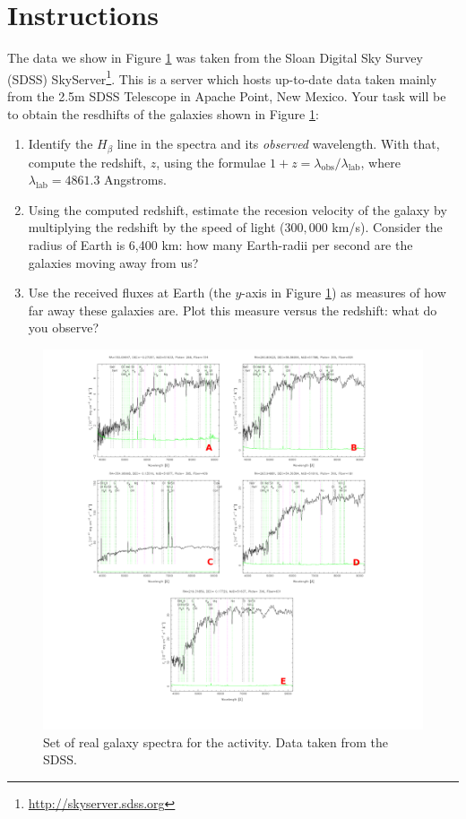 \documentclass{tufte-handout}
\begin{document}
\section{Instructions}\label{sec:intro}
\begin{fullwidth}
The data we show in Figure \ref{fig:spectra} was taken from the Sloan Digital Sky Survey (SDSS) 
SkyServer\footnote{\url{http://skyserver.sdss.org}}. This is a server which hosts up-to-date data taken mainly from the 
2.5m SDSS Telescope in Apache Point, New Mexico. Your task will be to obtain the resdhifts of the galaxies shown in 
Figure \ref{fig:spectra}:

\begin{enumerate}
\item Identify the $H_\beta$ line in the spectra and its \textit{observed} wavelength. With that, compute the redshift, $z$, using the formulae $1 + z = \lambda_{\textrm{obs}}/\lambda_{\textrm{lab}}$, where $\lambda_{\textrm{lab}}=4861.3$ Angstroms.
\item Using the computed redshift, estimate the recesion velocity of the galaxy by multiplying the redshift by the speed of light ($300,000$ km/s). Consider the radius of Earth is 6,400 km: how many Earth-radii per second are the galaxies moving away from us?
\item Use the received fluxes at Earth (the $y$-axis in Figure \ref{fig:spectra}) as measures of how far away these galaxies are. Plot this measure versus the redshift: what do you observe?
\end{enumerate}

\begin{figure}
  \includegraphics[width=2.0\columnwidth]{figures_activity3/spectra1.pdf}
  \caption{Set of real galaxy spectra for the activity. Data taken from the SDSS.}
  \label{fig:spectra}
\end{figure}

\end{fullwidth}
\end{document}
